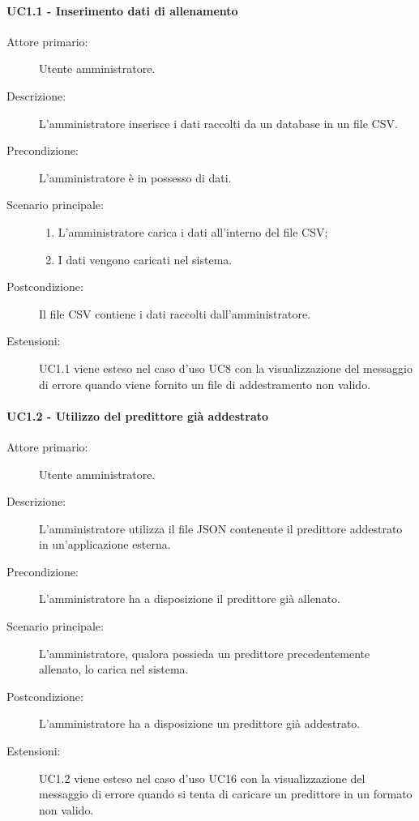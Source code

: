 \paragraph{UC1.1 - Inserimento dati di allenamento}
\label{sssec:uc1.1}
\begin{description}
  \item[Attore primario:] Utente amministratore.
  \item[Descrizione:] L'amministratore inserisce i dati raccolti da un database in un file CSV.
  \item[Precondizione:] L'amministratore è in possesso di dati.
  \item[Scenario principale:]
  \begin{enumerate}
    \item L'amministratore carica i dati all'interno del file CSV;
    \item I dati vengono caricati nel sistema.
  \end{enumerate}
  \item[Postcondizione:] Il file CSV contiene i dati raccolti dall'amministratore.
  \item[Estensioni:] UC1.1 viene esteso nel caso d'uso UC8 con la visualizzazione del messaggio di errore quando viene fornito un file di addestramento non valido.
\end{description}

\paragraph{UC1.2 - Utilizzo del predittore già addestrato}
\label{sssec:uc1.2}
\begin{description}
  \item[Attore primario:] Utente amministratore.
  \item[Descrizione:] L'amministratore utilizza il file JSON contenente il predittore addestrato in un'applicazione esterna.
  \item[Precondizione:] L'amministratore ha a disposizione il predittore già allenato.
  \item[Scenario principale:] L'amministratore, qualora possieda un predittore precedentemente allenato, lo carica nel sistema.
  \item[Postcondizione:] L'amministratore ha a disposizione un predittore già addestrato.
  \item[Estensioni:] UC1.2 viene esteso nel caso d'uso UC16 con la visualizzazione del messaggio di errore quando si tenta di caricare un predittore in un formato non valido.
\end{description}

